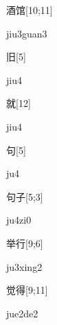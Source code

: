 \begin{verbete}{酒馆}[10;11]
\begin{pronuncia}{jiu3guan3}
\end{pronuncia}
\end{verbete}

\begin{verbete}[jiu4]{旧}[5]
\begin{pronuncia}{jiu4}
\end{pronuncia}
\end{verbete}

\begin{verbete}[jiu4]{就}[12]
\begin{pronuncia}{jiu4}
\end{pronuncia}
\end{verbete}

\begin{verbete}[ju4]{句}[5]
\begin{pronuncia}{ju4}
\end{pronuncia}
\end{verbete}

\begin{verbete}[ju4zi0]{句子}[5;3]
\begin{pronuncia}{ju4zi0}
\end{pronuncia}
\end{verbete}

\begin{verbete}[ju3xing2]{举行}[9;6]
\begin{pronuncia}{ju3xing2}
\end{pronuncia}
\end{verbete}

\begin{verbete}[jue2de2]{觉得}[9;11]
\begin{pronuncia}{jue2de2}
\end{pronuncia}
\end{verbete}

